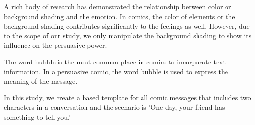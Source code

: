 A rich body of research has demonstrated the relationship between color or background shading and the emotion. In comics, the color of elements or the background shading contributes significantly to the feelings as well. However, due to the scope of our study, we only manipulate the background shading to show its influence on the persuasive power. \par
The word bubble is the most common place in comics to incorporate text information. In a persuasive comic, the word bubble is used to express the meaning of the message.  \par
In this study, we create a based template for all comic messages that includes two characters in a conversation and the scenario is 'One day, your friend has something to tell you.'\par
